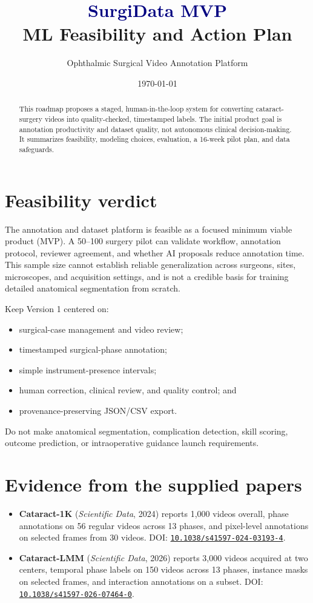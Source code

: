 \documentclass[11pt,a4paper]{article}
\title{\textcolor{navy}{SurgiData MVP}\\[0.3em]
  \large ML Feasibility and Action Plan}
\author{Ophthalmic Surgical Video Annotation Platform}
\date{\today}
\newcommand{\doi}[1]{\href{https://doi.org/#1}{\texttt{#1}}}
\begin{document}
\maketitle
\begin{abstract}
This roadmap proposes a staged, human-in-the-loop system for converting cataract-surgery videos into quality-checked, timestamped labels. The initial product goal is annotation productivity and dataset quality, not autonomous clinical decision-making. It summarizes feasibility, modeling choices, evaluation, a 16-week pilot plan, and data safeguards.
\end{abstract}
\tableofcontents
\bigskip

\section{Feasibility verdict}

The annotation and dataset platform is feasible as a focused minimum viable product (MVP). A 50--100 surgery pilot can validate workflow, annotation protocol, reviewer agreement, and whether AI proposals reduce annotation time. This sample size cannot establish reliable generalization across surgeons, sites, microscopes, and acquisition settings, and is not a credible basis for training detailed anatomical segmentation from scratch.

Keep Version 1 centered on:
\begin{itemize}
  \item surgical-case management and video review;
  \item timestamped surgical-phase annotation;
  \item simple instrument-presence intervals;
  \item human correction, clinical review, and quality control; and
  \item provenance-preserving JSON/CSV export.
\end{itemize}

Do not make anatomical segmentation, complication detection, skill scoring, outcome prediction, or intraoperative guidance launch requirements.

\section{Evidence from the supplied papers}

\begin{itemize}
  \item \textbf{Cataract-1K} (\emph{Scientific Data}, 2024) reports 1,000 videos overall, phase annotations on 56 regular videos across 13 phases, and pixel-level annotations on selected frames from 30 videos. DOI: \doi{10.1038/s41597-024-03193-4}.
  \item \textbf{Cataract-LMM} (\emph{Scientific Data}, 2026) reports 3,000 videos acquired at two centers, temporal phase labels on 150 videos across 13 phases, instance masks on selected frames, and interaction annotations on a subset. DOI: \doi{10.1038/s41597-026-07464-0}.
\end{itemize}
\end{document}
